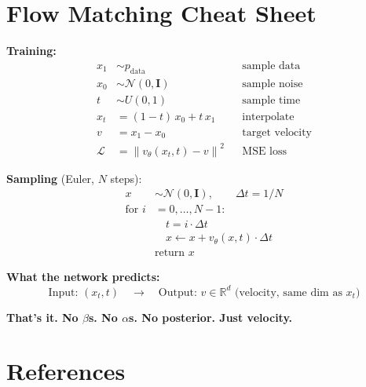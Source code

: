 \documentclass[11pt, a4paper]{article}
\newcommand{\vtheta}{v_\theta}
\newcommand{\R}{\mathbb{R}}
\newcommand{\N}{\mathcal{N}}
\newcommand{\Id}{\mathbf{I}}
\newcommand{\norm}[1]{\left\lVert #1 \right\rVert}
\begin{document}
\newpage
\section*{Flow Matching Cheat Sheet}

\begin{tcolorbox}[
  colback=fmgreen!5, colframe=fmgreen!80!black,
  fonttitle=\bfseries\large,
  title=Quick Reference Card,
  rounded corners, boxrule=1pt
]

\textbf{Training:}
\begin{align*}
  x_1 &\sim p_{\mathrm{data}} && \text{sample data} \\
  x_0 &\sim \N(0, \Id) && \text{sample noise} \\
  t   &\sim U(0, 1) && \text{sample time} \\
  x_t &= (1-t)\,x_0 + t\,x_1 && \text{interpolate} \\
  v   &= x_1 - x_0 && \text{target velocity} \\
  \mathcal{L} &= \norm{\vtheta(x_t, t) - v}^2 && \text{MSE loss}
\end{align*}

\textbf{Sampling} (Euler, $N$ steps):
\begin{align*}
  x &\sim \N(0, \Id), \qquad \Delta t = 1/N \\
  \text{for } i &= 0, \ldots, N{-}1: \\
  &\quad t = i \cdot \Delta t \\
  &\quad x \leftarrow x + \vtheta(x, t) \cdot \Delta t \\
  &\text{return } x
\end{align*}

\textbf{What the network predicts:}
\[
  \text{Input: } (x_t, t) \quad \longrightarrow \quad
  \text{Output: } v \in \R^d \text{ (velocity, same dim as $x_t$)}
\]

\medskip
\begin{center}
\large\bfseries
That's it.  No $\beta$s.  No $\alpha$s.  No posterior.  Just velocity.
\end{center}

\end{tcolorbox}

\section*{References}
\end{document}
